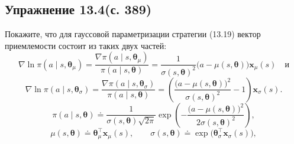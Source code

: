 \subsection{Упражнение 13.4(с. 389)}
Покажите, что для гауссовой параметризации стратегии (13.19) вектор
приемлемости состоит из таких двух частей:
\[
    \nabla\ln\pi(a\mid s,\boldsymbol\theta_\mu)
    = \frac{\nabla\pi(a\mid s,\boldsymbol\theta_\mu)}{\pi(a\mid s,\boldsymbol\theta)}
    = \frac{1}{\sigma(s,\boldsymbol\theta)^2}\big(a-\mu(s,\boldsymbol\theta)\big)\mathbf x_\mu(s)
    \quad\text{и}
\]
\[
    \nabla\ln\pi(a\mid s,\boldsymbol\theta_\sigma)
    = \frac{\nabla\pi(a\mid s,\boldsymbol\theta_\sigma)}{\pi(a\mid s,\boldsymbol\theta)}
    = \left(\frac{\big(a-\mu(s,\boldsymbol\theta)\big)^2}{\sigma(s,\boldsymbol\theta)^2}-1\right)\mathbf x_\sigma(s).
\]
\begin{equation}
    \pi(a\mid s,\boldsymbol\theta) \doteq
    \frac{1}{\sigma(s,\boldsymbol\theta)\sqrt{2\pi}}
    \exp\left(-\frac{\big(a-\mu(s,\boldsymbol\theta)\big)^2}{2\sigma(s,\boldsymbol\theta)^2}\right),
    \tag{13.19}
\end{equation}
\begin{equation}
    \mu(s,\boldsymbol\theta) \doteq \boldsymbol\theta_\mu^\top\mathbf x_\mu(s),
    \qquad
    \sigma(s,\boldsymbol\theta) \doteq \exp\big(\boldsymbol\theta_\sigma^\top\mathbf x_\sigma(s)\big),
    \tag{13.20}
\end{equation}
